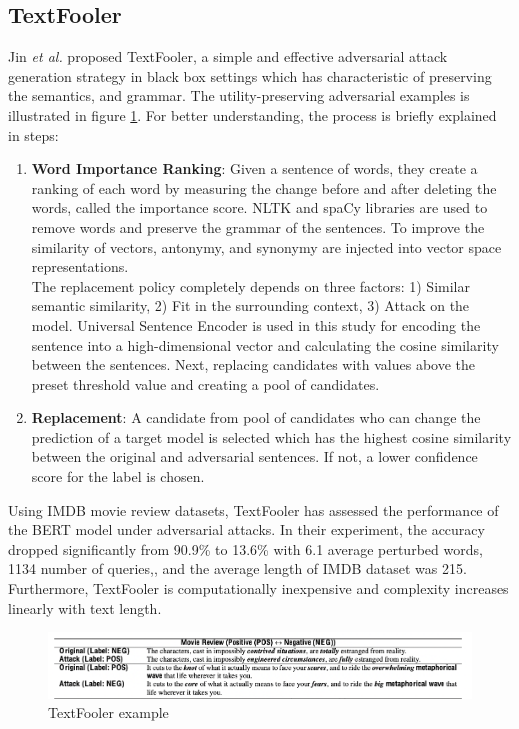 \documentclass[%
	BCOR=8mm, %
	DIV=12,
	toc=bibliography, %
	toc=listof, %
	oneside, %
	egregdoesnotlikesansseriftitles, %
	]{scrbook}
\begin{document}
\subsection{TextFooler}
\label{subsection:textfooler}
Jin \textit{et al.} \cite{jin_is_2020-1} proposed TextFooler, a simple and effective adversarial attack generation strategy in black box settings which has characteristic of preserving the semantics, and grammar. The utility-preserving adversarial examples is illustrated in figure \ref{diag:TextFoolerExp}. For better understanding, the process is briefly explained in steps:
\begin{enumerate}
    \item  \textbf{Word Importance Ranking}: Given a sentence of words, they create a ranking of each word by measuring the change before and after deleting the words, called the importance score. NLTK and spaCy libraries are used to remove words and preserve the grammar of the sentences. To improve the similarity of vectors, antonymy, and synonymy are injected into vector space representations.\\
    The replacement policy completely depends on three factors: 1) Similar semantic similarity, 2) Fit in the surrounding context, 3) Attack on the model. Universal Sentence Encoder \cite{cer_universal_2018} is used in this study for encoding the sentence into a high-dimensional vector and calculating the cosine similarity between the sentences. Next, replacing candidates with values above the preset threshold value and creating a pool of candidates.
    \item \textbf{Replacement}: A candidate from pool of candidates who can change the prediction of a target model is selected which has the highest cosine similarity between the original and adversarial sentences. If not, a lower confidence score for the label is chosen.
\end{enumerate}
Using IMDB movie review datasets, TextFooler has assessed the performance of the BERT model under adversarial attacks. In their experiment, the accuracy dropped significantly from 90.9\% to 13.6\% with 6.1 average perturbed words, 1134 number of queries,, and the average length of IMDB dataset was 215. Furthermore, TextFooler is computationally inexpensive and complexity increases linearly with text length. 
\begin{figure}[H]
    \centering
    \includegraphics[width=1.0\textwidth]{img/textfooler_example.png}
    \caption[Example of TextFooler]{TextFooler example  \cite{jia_certified_2019} }
    \label{diag:TextFoolerExp}
\end{figure}
\end{document}
